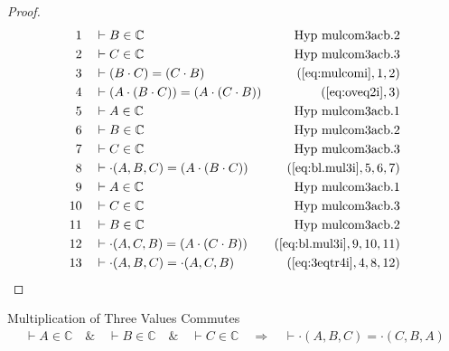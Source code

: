 \begin{proof}
\begin{align}
  1 &&  & \vdash B \in \mathbb{C}&\text{Hyp~mulcom3acb.2}\notag%
  \\ 2 &&  & \vdash C \in
\mathbb{C}&\text{Hyp~mulcom3acb.3}\notag%
  \\ 3 &&  & \vdash ( B \cdot C ) = ( C \cdot B
     )&(\mbox{\ref{eq:mulcomi}},1,2)\notag
  \\ 4 &&  & \vdash ( A \cdot ( B \cdot C ) ) = ( A \cdot ( C \cdot B )
     )&(\mbox{\ref{eq:oveq2i}},3)\notag
  \\ 5 &&  & \vdash A \in
\mathbb{C}&\text{Hyp~mulcom3acb.1}\notag%
  \\ 6 &&  & \vdash B \in
\mathbb{C}&\text{Hyp~mulcom3acb.2}\notag%
  \\ 7 &&  & \vdash C \in
\mathbb{C}&\text{Hyp~mulcom3acb.3}\notag%
  \\ 8 &&  & \vdash \cdot( A , B , C ) = ( A \cdot ( B \cdot C )
     )&(\mbox{\ref{eq:bl.mul3i}},5,6,7)\notag
  \\ 9 &&  & \vdash A \in
\mathbb{C}&\text{Hyp~mulcom3acb.1}\notag%
  \\ 10 &&  & \vdash C \in
\mathbb{C}&\text{Hyp~mulcom3acb.3}\notag%
  \\ 11 &&  & \vdash B \in
\mathbb{C}&\text{Hyp~mulcom3acb.2}\notag%
  \\ 12 &&  & \vdash \cdot( A , C , B ) = ( A \cdot ( C \cdot B )
     )&(\mbox{\ref{eq:bl.mul3i}},9,10,11)\notag
  \\ 13 &&  & \vdash \cdot( A , B , C ) = \cdot( A , C , B
     )&(\mbox{\ref{eq:3eqtr4i}},4,8,12)\notag
\end{align}
\end{proof}

\begin{lemma} {Multiplication of Three Values
Commutes}
\begin{align}
\vdash A \in \mathbb{C}\quad\&\quad \vdash B \in \mathbb{C}\quad\&\quad \vdash
    C \in \mathbb{C}\quad\Rightarrow\quad \vdash \cdot( A , B , C ) = \cdot( C
    , B , A )\label{eq:bl.mulcom3cba}\tag{bl.mulcom3cba}
\end{align}
\end{lemma}


